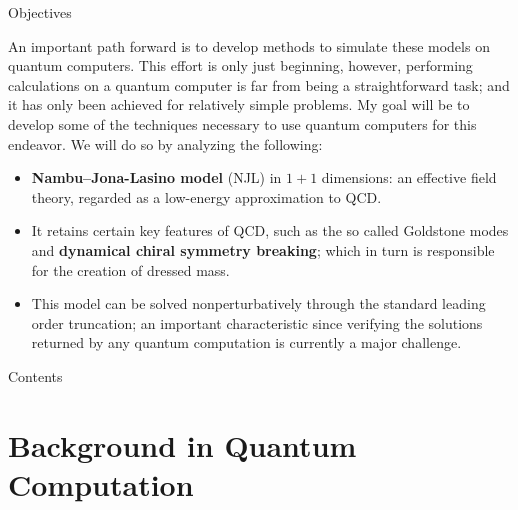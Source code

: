 \documentclass[9pt, handout, aspectratio=169]{beamer}	%
\begin{document}
\begin{frame}{Objectives}

	An important path forward is to develop methods to simulate these models on quantum computers. This effort is only just beginning, however, performing calculations on a quantum computer is far from being a straightforward task; and it has only been achieved for relatively simple problems. My goal will be to develop some of the techniques necessary to use quantum computers for this endeavor. We will do so by analyzing the following:

	\medskip

	\begin{itemize}
		\item<2-> \textbf{Nambu--Jona-Lasino model} (NJL) in $1+1$ dimensions: an effective field theory, regarded as a low-energy approximation to QCD.
		\item<3-> It retains certain key features of QCD, such as the so called Goldstone modes and \textbf{dynamical chiral symmetry breaking}; which in turn is responsible for the creation of dressed mass.
		\item<4-> This model can be solved nonperturbatively through the standard leading order truncation; an important characteristic since verifying the solutions returned by any quantum computation is currently a major challenge.
	\end{itemize}

\end{frame}


\begin{frame}[c]{Contents}
	\tableofcontents
\end{frame}


\section{Background in Quantum Computation}
\end{document}
